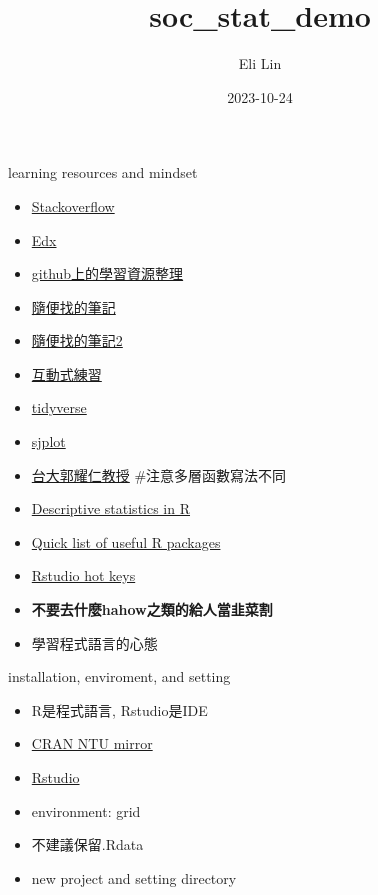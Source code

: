 \documentclass[
  ignorenonframetext,
]{beamer}
\title{soc\_stat\_demo}
\author{Eli Lin}
\date{2023-10-24}
\providecommand{\tightlist}{%
  \setlength{\itemsep}{0pt}\setlength{\parskip}{0pt}}
\begin{document}
\frame{\titlepage}

\begin{frame}{learning resources and mindset}
\protect\hypertarget{learning-resources-and-mindset}{}
\begin{itemize}
\tightlist
\item
  \href{https://stackoverflow.com/}{Stackoverflow}
\item
  \href{https://www.edx.org/learn/r-programming/harvard-university-data-science-r-basics?index=product\&queryID=e2a15d51e39a3dd02da1dc5ea276aaef\&position=1\&results_level=first-level-results\&term=r+basic\&objectID=course-91f52ef3-fa3f-4934-9d19-8d5a32635cd4\&campaign=Data+Science\%3A+R+Basics\&source=edX\&product_category=course\&placement_url=https\%3A\%2F\%2Fwww.edx.org\%2Fsearchhttps://}{Edx}
\item
  \href{https://github.com/ujjwalkarn/DataScienceR}{github上的學習資源整理}
\item
  \href{https://biocorecrg.github.io/CRG_RIntroduction/}{隨便找的筆記}
\item
  \href{https://bookdown.org/b08302310/R_learning_notes/}{隨便找的筆記2}
\item
  \href{https://app.datacamp.com/learn/courses/free-introduction-to-r}{互動式練習}
\item
  \href{https://app.datacamp.com/learn/courses/introduction-to-the-tidyverse}{tidyverse}
\item
  \href{https://strengejacke.github.io/sjPlot/}{sjplot}
\item
  \href{https://bookdown.org/tonykuoyj/eloquentr/}{台大郭耀仁教授}
  \#注意多層函數寫法不同
\item
  \href{https://statsandr.com/blog/descriptive-statistics-in-r/}{Descriptive
  statistics in R}
\item
  \href{https://support.posit.co/hc/en-us/articles/201057987-Quick-list-of-useful-R-packages}{Quick
  list of useful R packages}
\item
  \href{https://support.rstudio.com/hc/en-us/articles/200711853-Keyboard-Shortcuts}{Rstudio
  hot keys}
\item
  \textbf{不要去什麼hahow之類的給人當韭菜割}
\item
  學習程式語言的心態
\end{itemize}
\end{frame}

\begin{frame}{installation, enviroment, and setting}
\protect\hypertarget{installation-enviroment-and-setting}{}
\begin{itemize}
\tightlist
\item
  R是程式語言, Rstudio是IDE
\item
  \href{https://cran.csie.ntu.edu.tw/}{CRAN NTU mirror}
\item
  \href{https://posit.co/downloads/}{Rstudio}
\item
  environment: grid
\item
  不建議保留.Rdata
\item
  new project and setting directory
\end{itemize}
\end{frame}
\end{document}
